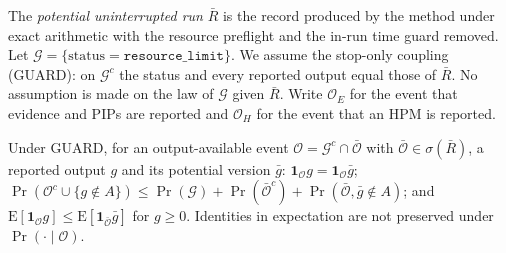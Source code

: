 
\begin{definition}
The \emph{potential uninterrupted run} $\bar R$ is the record produced by the method under exact arithmetic with
the resource preflight and the in-run time guard removed. Let $\mathcal G=\{\text{status}=\texttt{resource\_limit}\}$.
We assume the stop-only coupling (GUARD): on $\mathcal G^c$ the status and every reported output equal those of
$\bar R$. No assumption is made on the law of $\mathcal G$ given $\bar R$. Write $\mathcal O_E$ for the event that
evidence and PIPs are reported and $\mathcal O_H$ for the event that an HPM is reported.
\end{definition}

\begin{lemma}
Under GUARD, for an output-available event $\mathcal O=\mathcal G^c\cap\bar{\mathcal O}$ with
$\bar{\mathcal O}\in\sigma(\bar R)$, a reported output $g$ and its potential version $\bar g$:
$\mathbf 1_{\mathcal O}g=\mathbf 1_{\mathcal O}\bar g$;
$\Pr(\mathcal O^c\cup\{g\notin A\})\le\Pr(\mathcal G)+\Pr(\bar{\mathcal O}^c)+\Pr(\bar{\mathcal O},\bar g\notin A)$;
and $\mathrm E[\mathbf 1_{\mathcal O}g]\le\mathrm E[\mathbf 1_{\bar{\mathcal O}}\bar g]$ for $g\ge0$.
Identities in expectation are not preserved under $\Pr(\cdot\mid\mathcal O)$.
\end{lemma}

